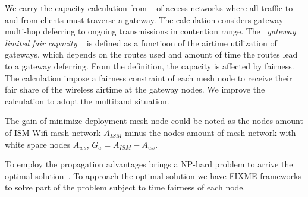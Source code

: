 We carry the capacity calculation from ~\cite{robinson2008adding} of access networks where all traffic to and from clients must traverse a gateway. The calculation considers gateway multi-hop deferring to ongoing transmissions in contention range. 
The ~\emph{gateway limited fair capacity} ~\cite{robinson2008adding} is defined as a functioon of the airtime utilization of gateways, which depends on the routes used and amount of time the routes lead to a gateway deferring. From the definition, the capacity is affected by fairness. The calculation impose a fairness constraint of each mesh node to receive their fair share of the wireless airtime at the gateway nodes. 
We improve the calculation to adopt the multiband situation.







The gain of minimize deployment mesh node could be noted as the nodes amount of ISM Wifi mesh network $A_{ISM}$ minus the nodes amount of mesh network with white space nodes $A_{ws}$, $G_a=A_{ISM}-A_{ws}$.


To employ the propagation advantages brings a NP-hard problem to arrive the optimal solution~\cite{arkoulis2013optimal}. 
To approach the optimal solution we have FIXME frameworks to solve part of the problem subject to time fairness of each node.





